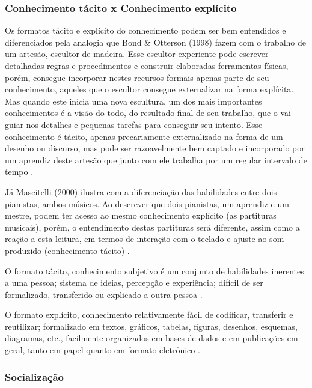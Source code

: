 
\subsubsection{Conhecimento tácito x Conhecimento explícito}

Os formatos tácito e explícito do conhecimento podem ser bem entendidos e diferenciados pela analogia que Bond \& Otterson (1998) \cite{bond1998creativity} fazem com o trabalho de um artesão, escultor de madeira. Esse escultor experiente pode escrever detalhadas regras e procedimentos e construir elaboradas ferramentas físicas, porém, consegue incorporar nestes recursos formais apenas parte de seu conhecimento, aqueles que o escultor consegue externalizar na forma explícita. Mas quando este inicia uma nova escultura, um dos mais importantes conhecimentos é a visão do todo, do resultado final de seu trabalho, que o vai guiar nos detalhes e pequenas tarefas para conseguir seu intento. Esse conhecimento é tácito, apenas precariamente externalizado na forma de um desenho ou discurso, mas pode ser razoavelmente bem captado e incorporado por um aprendiz deste artesão que junto com ele trabalha por um regular intervalo de tempo \cite{silva2004gestao}.

Já Mascitelli (2000) \cite{mascitelli2000experience} ilustra com a diferenciação das habilidades entre dois pianistas, ambos músicos. Ao descrever que dois pianistas, um aprendiz e um mestre, podem ter acesso ao mesmo conhecimento explícito (as partituras musicais), porém, o entendimento destas partituras será diferente, assim como a reação a esta leitura, em termos de interação com o teclado e ajuste ao som produzido (conhecimento tácito) \cite{silva2004gestao}.

O formato tácito, conhecimento subjetivo é um conjunto de habilidades inerentes a uma pessoa; sistema de ideias, percepção e experiência; difícil de ser formalizado, transferido ou explicado a outra pessoa \cite{silva2004gestao}.

O formato explícito, conhecimento relativamente fácil de codificar, transferir e reutilizar; formalizado em textos, gráficos, tabelas, figuras, desenhos, esquemas, diagramas, etc., facilmente organizados em bases de dados e em publicações em geral, tanto em papel quanto em formato eletrônico \cite{silva2004gestao}.


\subsubsection{Socialização}

